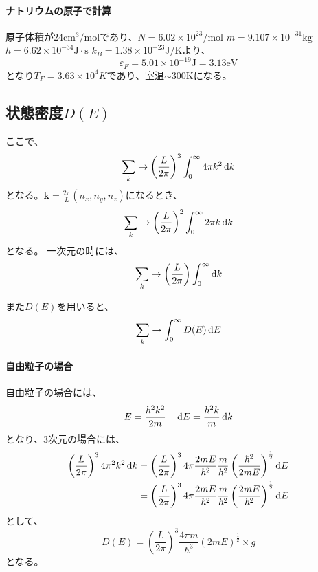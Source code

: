 \documentclass[titlepage]{ltjsarticle}
\begin{document}
\paragraph{ナトリウムの原子で計算}
原子体積が\(24 \mathrm{cm^3/mol}\)であり、\(N=6.02\times 10^{23} \mathrm{/mol}\)
\(m= 9.107\times 10^{-31} \mathrm{kg}\)\(h=6.62\times 10^{-34}\mathrm{J\cdot s}\)
\(k_B = 1.38 \times 10^{-23} \mathrm{J/K}\)より、
\begin{equation}
  \varepsilon_F = 5.01 \times 10^{-19} \mathrm{J} = 3.13 \mathrm{eV}
\end{equation}
となり\(T_F = 3.63 \times 10^4 K\)であり、室温\(\sim 300 \mathrm{K}\)になる。

\subsection{状態密度\(D(E)\)}
ここで、
\begin{equation}
  \sum_k \to  \left( \frac{L}{2\pi} \right)^3 \int_{0}^{\infty} 4 \pi k^2 \odif{k}
\end{equation}
となる。\(\bm{k} = \frac{2\pi}{L}\left( n_x,n_y,n_z \right)\)になるとき、
\begin{equation}
  \sum_k \to \left( \frac{L}{2\pi} \right)^2 \int^{\infty}_{0}2\pi k \odif{k}
\end{equation}
となる。
一次元の時には、
\begin{equation}
  \sum_k \to \left( \frac{L}{2\pi} \right) \int^{\infty}_{0} \odif{k}
\end{equation}

また\(D(E)\)を用いると、
\begin{equation}
  \sum_k \to \int_{0}^{\infty}D(E) \odif{E}
\end{equation}

\paragraph{自由粒子の場合}
自由粒子の場合には、
\begin{equation}
  E = \frac{\hbar^2 k^2}{2m} \quad  \odif{E} = \frac{\hbar^2 k}{m} \odif{k}
\end{equation}
となり、3次元の場合には、
\begin{align}
  \left( \frac{L}{2\pi} \right)^3 4\pi^2k^2 \odif{k} & = \left( \frac{L}{2\pi} \right)^3 4 \pi \frac{2mE}{\hbar^2} \frac{m}{\hbar^2} \left( \frac{\hbar^2}{2mE} \right)^{\frac{1}{2}} \odif{E} \\
  & = \left( \frac{L}{2\pi} \right)^3 4 \pi \frac{2mE}{\hbar^2} \frac{m}{\hbar^2} \left( \frac{2m E}{\hbar^2} \right)^{\frac{1}{2}} \odif{E} \\
\end{align}
として、
\begin{equation}
  D(E) = \left( \frac{L}{2\pi} \right)^3 \frac{4\pi m}{\hbar^3} (2mE)^{\frac{1}{2}} \times g 
\end{equation}
となる。
\end{document}
